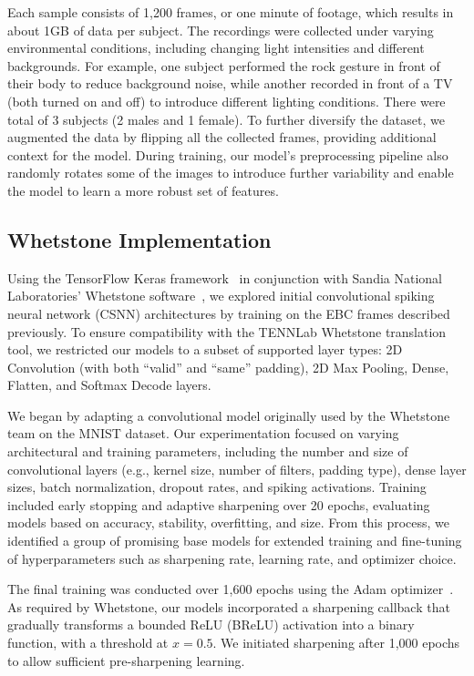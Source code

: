 \documentclass[conference]{IEEEtran}
\begin{document}
Each sample consists of 1,200 frames, or one minute of footage, which results in about 1GB of data per subject. The recordings were collected under varying environmental conditions, including changing light intensities and different backgrounds. For example, one subject performed the rock gesture in front of their body to reduce background noise, while another recorded in front of a TV (both turned on and off) to introduce different lighting conditions. There were total of 3 subjects (2 males and 1 female). To further diversify the dataset, we augmented the data by flipping all the collected frames, providing additional context for the model. During training, our model’s preprocessing pipeline also randomly rotates some of the images to introduce further variability and enable the model to learn a more robust set of features.

\subsection{Whetstone Implementation}

Using the TensorFlow Keras framework~\cite{keras} in conjunction with Sandia National Laboratories' Whetstone software~\cite{whetstone}, we explored initial convolutional spiking neural network (CSNN) architectures by training on the EBC frames described previously. To ensure compatibility with the TENNLab Whetstone translation tool, we restricted our models to a subset of supported layer types: 2D Convolution (with both ``valid'' and ``same'' padding), 2D Max Pooling, Dense, Flatten, and Softmax Decode layers.

We began by adapting a convolutional model originally used by the Whetstone team on the MNIST dataset. Our experimentation focused on varying architectural and training parameters, including the number and size of convolutional layers (e.g., kernel size, number of filters, padding type), dense layer sizes, batch normalization, dropout rates, and spiking activations. Training included early stopping and adaptive sharpening over 20 epochs, evaluating models based on accuracy, stability, overfitting, and size. From this process, we identified a group of promising base models for extended training and fine-tuning of hyperparameters such as sharpening rate, learning rate, and optimizer choice.

The final training was conducted over 1,600 epochs using the Adam optimizer~\cite{adam}. As required by Whetstone, our models incorporated a sharpening callback that gradually transforms a bounded ReLU (BReLU) activation into a binary function, with a threshold at $x = 0.5$. We initiated sharpening after 1,000 epochs to allow sufficient pre-sharpening learning.
\end{document}

